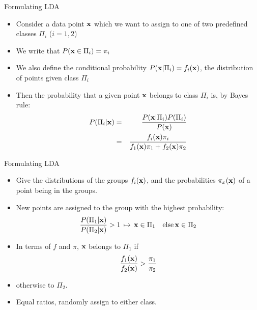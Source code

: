 \documentclass[aspectratio=169]{beamer}
\begin{document}
\begin{frame}{Formulating LDA}
  \begin{itemize}
    \item Consider a data point $\mathbf{x}$ which we want to assign to one of two predefined classes $\Pi_i$ ($i=1,2$)
    \item We write that $P(\mathbf{x}\in\Pi_i) = \pi_i$
    \item We also define the conditional probability $P(\mathbf{x}|\Pi_i)=f_i(\mathbf{x})$, the distribution of points given class $\Pi_i$
    \item Then the probability that a given point $\mathbf{x}$ belongs to class $\Pi_i$ is, by Bayes rule:
      \begin{eqnarray*}
        P(\Pi_i|\mathbf{x})  &=& \frac{P(\mathbf{x}|\Pi_i)P(\Pi_i)}{P(\mathbf{x})}\\
        &=& \frac{f_i(\mathbf{x})\pi_i}{f_1(\mathbf{x})\pi_1+f_2(\mathbf{x})\pi_2}
      \end{eqnarray*}
  \end{itemize}      
\end{frame}

\begin{frame}{Formulating LDA}
  \begin{itemize}
    \item Give the distributions of the groups $f_i(\mathbf{x})$, and the probabilities $\pi_x(\mathbf{x})$ of a point being in the groups.
    \item New points are assigned to the group with the highest probability:
      \begin{equation*}
        \frac{P(\Pi_1|\mathbf{x})}{P(\Pi_2|\mathbf{x})}>1 \,\mapsto\, \mathbf{x}\in\Pi_1 \quad \mbox{else}\, \mathbf{x}\in\Pi_2
      \end{equation*}
    \item In terms of $f$ and $\pi$, $\mathbf{x}$ belongs to $\Pi_1$ if
      \begin{equation*}
        \frac{f_1(\mathbf{x})}{f_2(\mathbf{x})}>\frac{\pi_1}{\pi_2}\label{eq:classratio}
      \end{equation*}
    \item otherwise to $\Pi_2$. 
    \item Equal ratios, randomly assign to either class.
  \end{itemize}
\end{frame}
\end{document}
